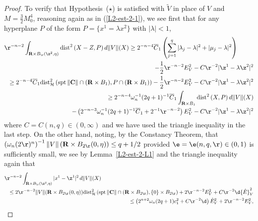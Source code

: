 \documentclass[a4paper,11pt]{amsart}
\begin{document}
\begin{proof}
To verify that Hypothesis~($\star$) is satisfied with $\widetilde{V}$ in place of $V$ and $M = \frac{3}{2}M_{0}^{4}$, reasoning again as in (\ref{L2-est-2-1}), we see first that for any hyperplane $P$ of the form $P = \{x^{1}  = \lambda x^{2}\}$ with $|\lambda| < 1$, 
\begin{eqnarray}\label{L2-est-2-2}
\r^{-n-2}\int_{{\mathbf R} \times B_{\r}(\z^{2}, \eta)} {\rm dist}^{2} \, (X - Z, P) \, d\|V\|(X) \geq 
 2^{-n-4}\overline{C}_{1}\left(\sum_{j=1}^{q} |\lambda_{j} - \lambda|^{2} + |\mu_{j}-\lambda|^{2}\right)&&\nonumber\\
&&\hspace{-2in}  -\frac{1}{2}\r^{-n-2}E_{V}^{2} - C\r^{-2}|\z^{1} - \lambda\z^{2}|^{2}\nonumber\\
&&\hspace{-5.5in} \geq   2^{-n-4}\overline{C}_{1}{\rm dist}_{\mathcal H}^{2} \, ({\rm spt} \, \|{\mathbf C}\| \cap ({\mathbf R} \times B_{1}), P \cap ({\mathbf R} \times B_{1})) - \frac{1}{2}\r^{-n-2}E_{V}^{2} - C\r^{-2}|\z^{1} - \lambda\z^{2}|^{2}\nonumber\\
&&\hspace{-5.5in} \geq 2^{-n-4}\omega_{n}^{-1}(2q + 1)^{-1}\overline{C}_{1} \int_{{\mathbf R} \times B_{1}}{\rm dist}^{2} \, (X, P) \, d\|V\|(X)\nonumber\\
&&\hspace{-4in} - \left(2^{-n-3}\omega_{n}^{-1}(2q +1)^{-1}\overline{C}_{1} + 2^{-1}\r^{-n-2}\right)E_{V}^{2} - C\r^{-2}|\z^{1} - \lambda\z^{2}|^{2}
\end{eqnarray}
where $C = C(n, q) \in (0, \infty)$ and we have used the triangle inequality in the last step. On the other hand, noting, by the Constancy Theorem, that
$\left(\omega_{n}(2\r)^{n}\right)^{-1}\|V\|\left({\mathbf R} \times B_{2\r}(0, \eta)\right) \leq q + 1/2$ provided $\e = \e(n, q, \r) \in (0, 1)$ is sufficiently small, we see by Lemma~\ref{L2-est-2-L1} and the triangle inequality again that 
\begin{eqnarray}\label{L2-est-2-3}
\r^{-n-2}\int_{{\mathbf R} \times B_{\r}(\z^{2}, \eta)}|x^{1} - \z^{1}|^{2} \, d\|V\|(X)&&\nonumber\\ 
&&\hspace{-2.5in}\leq 2\r^{-n-2}\|V\|({\mathbf R} \times B_{2\r}(0, \eta)){\rm dist}^{2}_{\mathcal H} \,({\rm spt} \, \|{\mathbf C}\| \cap ({\mathbf R} \times B_{2\r}), \{0\} \times B_{2\r}) +  2\r^{-n-2}E_{V}^{2} + C\r^{-2}\d{\hat E}_{V}^{2}\nonumber\\
&&\hspace{-1in} \leq \left(2^{n+2}\omega_{n}(2q + 1)c_{1}^{2} + C\r^{-2}\d\right){\hat E}_{V}^{2} +  2 \r^{-n-2}E_{V}^{2},  

\end{eqnarray}
\end{proof}
\end{document}

